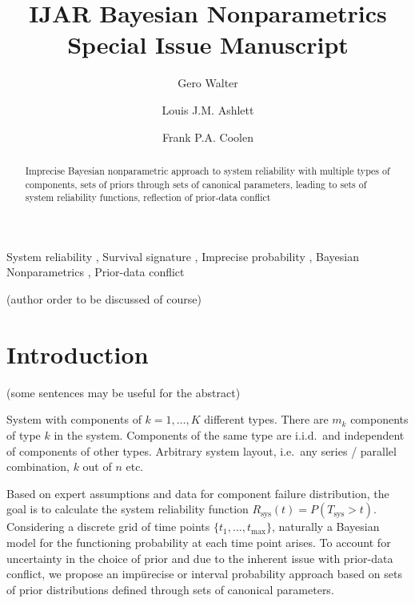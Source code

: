 \documentclass[authoryear, 12pt, a4paper]{elsarticle}
\newcommand{\Rsys}{R_\text{sys}}
\def\Tsys{T_\text{sys}}
\def\tmax{t_\text{max}}
\begin{document}

\begin{frontmatter}
\title{IJAR Bayesian Nonparametrics Special Issue Manuscript}

\author[ein]{Gero Walter}
\author[oxf]{Louis J.M. Ashlett}
\author[dur]{Frank P.A. Coolen}

\address[ein]{School of Industrial Engineering, Eindhoven University of Technology, Eindhoven, NL}
\address[oxf]{Department of Statistics, University of Oxford, Oxford, UK}
\address[dur]{Department of Mathematical Sciences, Durham University, Durham, UK}


\begin{abstract}
Imprecise Bayesian nonparametric approach to system reliability with multiple types of components,
sets of priors through sets of canonical parameters,
leading to sets of system reliability functions,
reflection of prior-data conflict
\end{abstract}

\begin{keyword}
System reliability \sep
Survival signature \sep
Imprecise probability \sep
Bayesian Nonparametrics \sep
Prior-data conflict
\end{keyword}
\end{frontmatter}



(author order to be discussed of course)

\section{Introduction}

(some sentences may be useful for the abstract)

System with components of $k=1,\ldots,K$ different types.
There are $m_k$ components of type $k$ in the system.
Components of the same type are i.i.d.\ and independent of components of other types.
Arbitrary system layout, i.e.\ any series / parallel combination, $k$ out of $n$ etc.

Based on expert assumptions and data for component failure distribution,
the goal is to calculate the system reliability function $\Rsys(t) = P(\Tsys > t)$.
Considering a discrete grid of time points $\{t_1, \ldots, \tmax\}$,
naturally a Bayesian model for the functioning probability at each time point arises.
To account for uncertainty in the choice of prior and due to the inherent issue with prior-data conflict,
we propose an impürecise or interval probability approach
based on sets of prior distributions defined through sets of canonical parameters.
\end{document}
